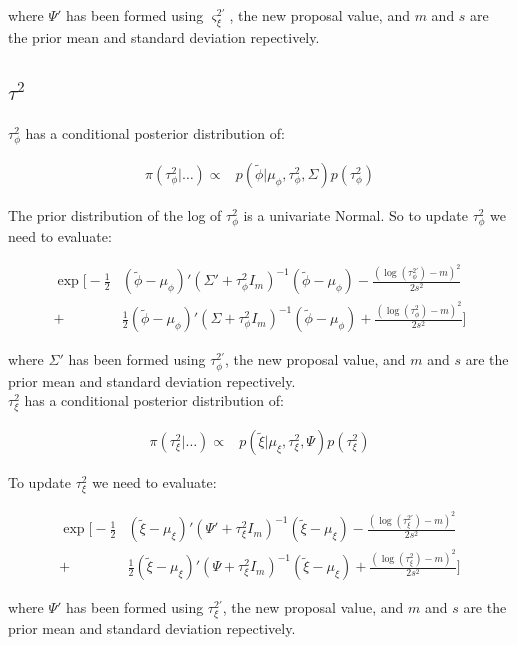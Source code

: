 \documentclass{article}
\begin{document}
where $\Psi'$ has been formed using $\varsigma^{2'}_\xi$, the new proposal value, and $m$ and $s$ are the prior mean and standard deviation repectively. \\

\subsection{$\tau^2$}

$\tau^2_\phi$ has a conditional posterior distribution of:

\begin{align*}
\pi(\tau^2_\phi | \dots ) \propto & p(\tilde{\phi} | \mu_\phi, \tau^2_\phi, \Sigma) p(\tau^2_\phi)
\end{align*}

The prior distribution of the log of $\tau^2_\phi$ is a univariate Normal. So to update $\tau^2_\phi$ we need to evaluate:

\begin{align}
\exp \Bigg[ -\frac{1}{2} & (\tilde{\phi} - \mu_\phi)' (\Sigma' + \tau^2_\phi I_m)^{-1} (\tilde{\phi} - \mu_\phi) - \frac{(\log(\tau^{2'}_\phi) - m)^2}{2 s^2} \nonumber \\
+ & \frac{1}{2} (\tilde{\phi} - \mu_\phi)' (\Sigma + \tau^2_\phi I_m)^{-1} (\tilde{\phi} - \mu_\phi) + \frac{(\log(\tau^2_\phi) - m)^2}{2 s^2} \Bigg] \label{eq:2t1}
\end{align}

where $\Sigma'$ has been formed using $\tau^{2'}_\phi$, the new proposal value, and $m$ and $s$ are the prior mean and standard deviation repectively. \\

$\tau^2_\xi$ has a conditional posterior distribution of:

\begin{align*}
\pi(\tau^2_\xi | \dots ) \propto & p(\tilde{\xi} | \mu_\xi, \tau^2_\xi, \Psi) p(\tau^2_\xi)
\end{align*}

To update $\tau^2_\xi$ we need to evaluate:

\begin{align}
\exp \Bigg[ -\frac{1}{2} & (\tilde{\xi} - \mu_\xi)' (\Psi' + \tau^2_\xi I_m)^{-1} (\tilde{\xi} - \mu_\xi) - \frac{(\log(\tau^{2'}_\xi) - m)^2}{2 s^2} \nonumber \\
+ & \frac{1}{2} (\tilde{\xi} - \mu_\xi)' (\Psi + \tau^2_\xi I_m)^{-1} (\tilde{\xi} - \mu_\xi) + \frac{(\log(\tau^2_\xi) - m)^2}{2 s^2} \Bigg] \label{eq:2t2}
\end{align}

where $\Psi'$ has been formed using $\tau^{2'}_\xi$, the new proposal value, and $m$ and $s$ are the prior mean and standard deviation repectively. \\
\end{document}
